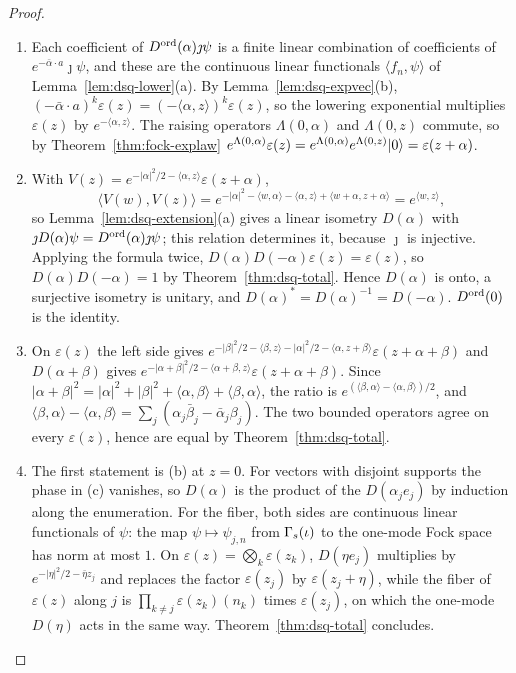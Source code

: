 \begin{veteenv}
\begin{proof}
\begin{enumerate}
\item[(a)] Each coefficient of $D^{\mathrm{ord}}(\alpha)\jmath\psi$ is a finite linear combination of coefficients of
$e^{-\bar\alpha\cdot a}\jmath\psi$, and these are the continuous linear functionals $\langle f_n,\psi\rangle$ of
Lemma~\ref{lem:dsq-lower}(a). By Lemma~\ref{lem:dsq-expvec}(b), $(-\bar\alpha\cdot a)^k\varepsilon(z)=(-\langle\alpha,z\rangle)^k
\varepsilon(z)$, so the lowering exponential multiplies $\varepsilon(z)$ by $e^{-\langle\alpha,z\rangle}$. The raising
operators $\Lambda(0,\alpha)$ and $\Lambda(0,z)$ commute, so by Theorem~\ref{thm:fock-explaw}
$e^{\Lambda(0,\alpha)}\varepsilon(z)=e^{\Lambda(0,\alpha)}e^{\Lambda(0,z)}\lvert 0\rangle=\varepsilon(z+\alpha)$.
\item[(b)] With $V(z)=e^{-\lvert\alpha\rvert^2/2-\langle\alpha,z\rangle}\varepsilon(z+\alpha)$,
\[
 \langle V(w),V(z)\rangle=e^{-\lvert\alpha\rvert^2-\langle w,\alpha\rangle-\langle\alpha,z\rangle+\langle w+\alpha,z+\alpha\rangle}
 =e^{\langle w,z\rangle},
\]
so Lemma~\ref{lem:dsq-extension}(a) gives a linear isometry $D(\alpha)$ with $\jmath D(\alpha)\psi=D^{\mathrm{ord}}(\alpha)\jmath\psi$; this
relation determines it, because $\jmath$ is injective. Applying the formula twice, $D(\alpha)D(-\alpha)\varepsilon(z)=\varepsilon(z)$, so
$D(\alpha)D(-\alpha)=1$ by Theorem~\ref{thm:dsq-total}. Hence $D(\alpha)$ is onto, a surjective isometry is unitary, and
$D(\alpha)^*=D(\alpha)^{-1}=D(-\alpha)$. $D^{\mathrm{ord}}(0)$ is the identity.
\item[(c)] On $\varepsilon(z)$ the left side gives $e^{-\lvert\beta\rvert^2/2-\langle\beta,z\rangle-\lvert\alpha\rvert^2/2-\langle\alpha,
z+\beta\rangle}\varepsilon(z+\alpha+\beta)$ and $D(\alpha+\beta)$ gives $e^{-\lvert\alpha+\beta\rvert^2/2-\langle\alpha+\beta,z
\rangle}\varepsilon(z+\alpha+\beta)$. Since $\lvert\alpha+\beta\rvert^2=\lvert\alpha\rvert^2+\lvert\beta\rvert^2+\langle\alpha,\beta\rangle
+\langle\beta,\alpha\rangle$, the ratio is $e^{(\langle\beta,\alpha\rangle-\langle\alpha,\beta\rangle)/2}$, and
$\langle\beta,\alpha\rangle-\langle\alpha,\beta\rangle=\sum_j(\alpha_j\bar\beta_j-\bar\alpha_j\beta_j)$. The two bounded
operators agree on every $\varepsilon(z)$, hence are equal by Theorem~\ref{thm:dsq-total}.
\item[(d)] The first statement is (b) at $z=0$. For vectors with disjoint supports the phase in (c) vanishes, so
$D(\alpha)$ is the product of the $D(\alpha_je_j)$ by induction along the enumeration. For the fiber, both sides are
continuous linear functionals of $\psi$: the map $\psi\mapsto\psi_{j,n}$ from $\Gamma_s(\iota)$ to the one-mode Fock space has norm at
most $1$. On $\varepsilon(z)=\bigotimes_k\varepsilon(z_k)$, $D(\eta e_j)$ multiplies by $e^{-\lvert\eta\rvert^2/2-\bar\eta z_j}$ and
replaces the factor $\varepsilon(z_j)$ by $\varepsilon(z_j+\eta)$, while the fiber of $\varepsilon(z)$ along $j$ is
$\prod_{k\ne j}\varepsilon(z_k)(n_k)$ times $\varepsilon(z_j)$, on which the one-mode $D(\eta)$ acts in the same way.
Theorem~\ref{thm:dsq-total} concludes.\qedhere
\end{enumerate}
\end{proof}


\end{veteenv}
